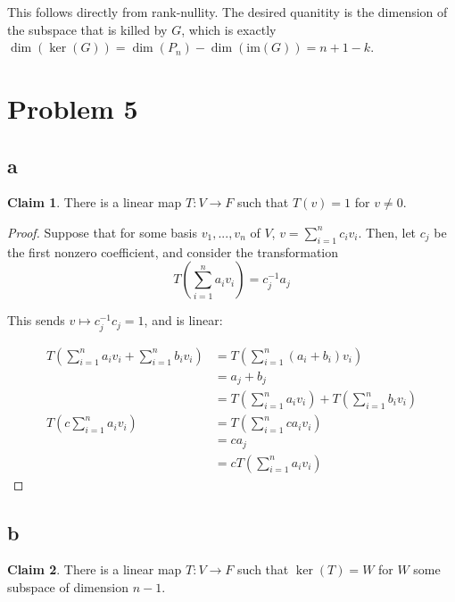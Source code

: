 \documentclass[12pt,letterpaper]{article}
\theoremstyle{definition}
\newtheorem*{claim}{Claim}
\newcommand{\im}{\mathrm{im}}
\begin{document}
This follows directly from rank-nullity. The desired quanitity is the dimension
of the subspace that is killed by $G$, which is exactly $\dim(\ker(G)) =
\dim(P_n) - \dim(\im(G)) = n + 1 - k$.

\section*{Problem 5}

\subsection*{a}

\begin{claim}
  There is a linear map $T: V \rightarrow F$ such that $T(v) = 1$ for $v \neq 0$.
\end{claim}

\begin{proof}
  Suppose that for some basis $v_1, ..., v_n$ of $V$, $v = \sum_{i=1}^n c_iv_i$.
  Then, let $c_j$ be the first nonzero coefficient, and consider the
  transformation
  \[
    T(\sum_{i=1}^na_iv_i) = c_j^{-1}a_j
  \]

  This sends $v \mapsto c_j^{-1}c_j = 1$, and is linear:

  \begin{align*}
    T(\sum_{i=1}^na_iv_i + \sum_{i=1}^nb_iv_i) &= T(\sum_{i=1}^n(a_i+b_i)v_i) \\
                                               &= a_j + b_j \\
                                               &= T(\sum_{i=1}^na_iv_i) + T(\sum_{i=1}^nb_iv_i) \\
    T(c\sum_{i=1}^na_iv_i) &= T(\sum_{i=1}^nca_iv_i) \\
                                               &= ca_j \\
                                               &= cT(\sum_{i=1}^na_iv_i)
  \end{align*}
\end{proof}

\subsection*{b}

\begin{claim}
  There is a linear map $T: V \rightarrow F$ such that $\ker(T) = W$ for $W$
  some subspace of dimension $n - 1$.
\end{claim}
\end{document}
